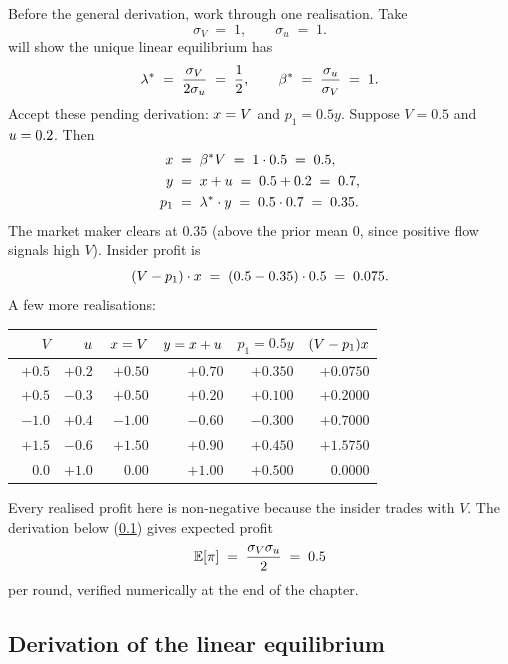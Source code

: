 Before the general derivation, work through one realisation. Take
\[
  \sigma_V \;=\; 1, \qquad \sigma_u \;=\; 1.
\]
 will show the unique linear equilibrium has
\[
  \lambda^\ast \;=\; \frac{\sigma_V}{2\sigma_u} \;=\; \frac{1}{2},
  \qquad
  \beta^\ast \;=\; \frac{\sigma_u}{\sigma_V} \;=\; 1.
\]
Accept these pending derivation: $x = V$ and $p_1 = 0.5 y$.
Suppose $V = 0.5$ and $u = 0.2$. Then
\begin{align*}
  x \;&=\; \beta^\ast V \;=\; 1 \cdot 0.5 \;=\; 0.5, \\
  y \;&=\; x + u \;=\; 0.5 + 0.2 \;=\; 0.7, \\
  p_1 \;&=\; \lambda^\ast \cdot y \;=\; 0.5 \cdot 0.7 \;=\; 0.35.
\end{align*}
The market maker clears at $0.35$ (above the prior mean $0$, since
positive flow signals high $V$). Insider profit is
\[
  (V - p_1) \cdot x \;=\; (0.5 - 0.35) \cdot 0.5 \;=\; 0.075.
\]
A few more realisations:

\begin{center}
\begin{tabular}{rrrrrr}
\toprule
$V$ & $u$ & $x = V$ & $y = x + u$ & $p_1 = 0.5 y$ & $(V - p_1)x$ \\
\midrule
$+0.5$ & $+0.2$ & $+0.50$ & $+0.70$ & $+0.350$ & $+0.0750$ \\
$+0.5$ & $-0.3$ & $+0.50$ & $+0.20$ & $+0.100$ & $+0.2000$ \\
$-1.0$ & $+0.4$ & $-1.00$ & $-0.60$ & $-0.300$ & $+0.7000$ \\
$+1.5$ & $-0.6$ & $+1.50$ & $+0.90$ & $+0.450$ & $+1.5750$ \\
$\phantom{+}0.0$ & $+1.0$ & $\phantom{+}0.00$ & $+1.00$ & $+0.500$ & $\phantom{+}0.0000$ \\
\bottomrule
\end{tabular}
\end{center}

Every realised profit here is non-negative because the insider
trades with $V$. The derivation below (\cref{subsec:kyle_deriv})
gives expected profit
\[
  \mathbb{E}[\pi] \;=\; \frac{\sigma_V \sigma_u}{2}
  \;=\; 0.5
\]
per round, verified numerically at the end of the chapter.

\subsection{Derivation of the linear equilibrium}
\label{subsec:kyle_deriv}

